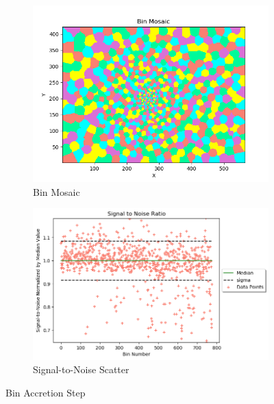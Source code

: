 \documentclass[11pt,letterpaper]{article}
\begin{document}
\begin{figure}
	\centering
	\begin{subfigure}{.5\textwidth}
		\centering
		\includegraphics[width=.9\linewidth]{pictures/bin_acc}
		\caption{Bin Mosaic}
		\label{fig:sub1}
	\end{subfigure}%
	\begin{subfigure}{.5\textwidth}
		\centering
		\includegraphics[width=.9\linewidth]{pictures/bin_acc_scatter}
		\caption{Signal-to-Noise Scatter}
		\label{fig:sub2}
	\end{subfigure}
	\caption{Bin Accretion Step}
	\label{fig:test}
\end{figure}
\end{document}
